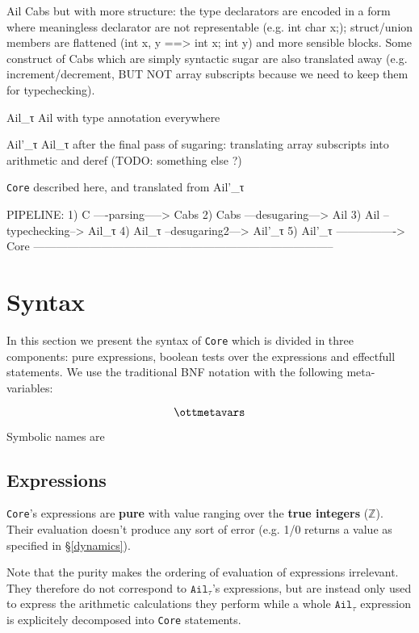 \documentclass[12pt, a4paper]{article}
\newcommand{\Z}{\ensuremath{\mathbb{Z}}}
\newcommand{\core}{\texttt{Core}}
\newcommand{\ailtau}{$\texttt{Ail}_\tau$}
\begin{document}
Ail    Cabs but with more structure: the type declarators are encoded in a form
       where meaningless declarator are not representable (e.g. int char x;);
       struct/union members are flattened (int x, y ==> int x; int y) and more
       sensible blocks. Some construct of Cabs which are simply syntactic sugar
       are also translated away (e.g. increment/decrement, BUT NOT array
       subscripts because we need to keep them for typechecking).

Ail\_τ    Ail with type annotation everywhere

Ail'\_τ    Ail\_τ after the final pass of sugaring: translating array subscripts
          into arithmetic and deref (TODO: something else ?)

\core{}    described here, and translated from Ail'\_τ


PIPELINE:
  1) C      ----parsing-----> Cabs
  2) Cabs   ---desugaring---> Ail
  3) Ail    --typechecking--> Ail\_τ
  4) Ail\_τ  --desugaring2---> Ail'\_τ
  5) Ail'\_τ ----------------> Core
--------------------------------------------------------------------------------


\newpage
\section{Syntax}

In this section we present the syntax of \core{} which is divided in three components: pure expressions, boolean tests over the expressions and effectfull statements.
We use the traditional BNF notation with the following meta-variables:

\[
\ottmetavars
\]

Symbolic names are 


\subsection{Expressions}
\core{}'s expressions are {\bf pure} with value ranging over the {\bf true integers} ($\Z$).
Their evaluation doesn't produce any sort of error (e.g. 1/0 returns a value as specified in \S\ref{dynamics}).

Note that the purity makes the ordering of evaluation of expressions irrelevant.
They therefore do not correspond to \ailtau{}'s expressions, but are instead only used to express the arithmetic calculations they perform while a whole \ailtau{} expression is explicitely decomposed into \core{} statements.


\end{document}
